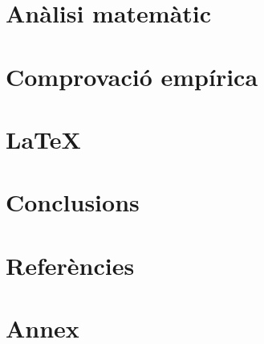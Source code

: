 \documentclass[12pt, a4paper, oneside]{report}
\begin{document}


\chapter{Anàlisi matemàtic}


\chapter{Comprovació empírica}


\chapter{\LaTeX}


\chapter{Conclusions}


\chapter{Referències}


\chapter{Annex}

\end{document}
